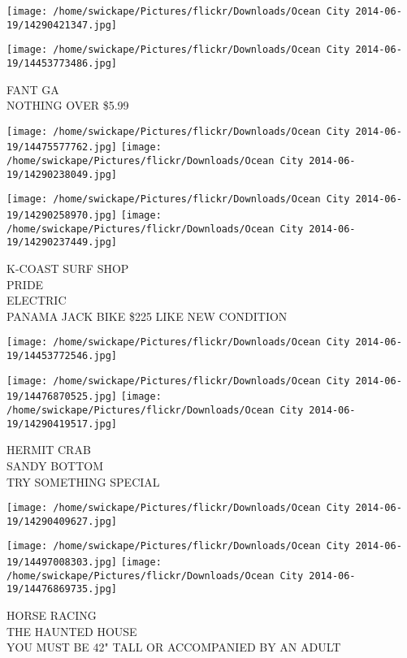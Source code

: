 \documentclass[10pt,letterpaper]{article}
\begin{document}
\texttt{[image: /home/swickape/Pictures/flickr/Downloads/Ocean City 2014-06-19/14290421347.jpg]}

\vspace{0.25in}
\texttt{[image: /home/swickape/Pictures/flickr/Downloads/Ocean City 2014-06-19/14453773486.jpg]}

FANT GA\\
NOTHING OVER \$5.99\\
\pagebreak

\texttt{[image: /home/swickape/Pictures/flickr/Downloads/Ocean City 2014-06-19/14475577762.jpg]}
\texttt{[image: /home/swickape/Pictures/flickr/Downloads/Ocean City 2014-06-19/14290238049.jpg]}

\texttt{[image: /home/swickape/Pictures/flickr/Downloads/Ocean City 2014-06-19/14290258970.jpg]}
\texttt{[image: /home/swickape/Pictures/flickr/Downloads/Ocean City 2014-06-19/14290237449.jpg]}

K{-}COAST SURF SHOP\\
PRIDE\\
ELECTRIC\\
PANAMA JACK BIKE \$225 LIKE NEW CONDITION\\
\pagebreak

\texttt{[image: /home/swickape/Pictures/flickr/Downloads/Ocean City 2014-06-19/14453772546.jpg]}

\vspace{0.25in}
\texttt{[image: /home/swickape/Pictures/flickr/Downloads/Ocean City 2014-06-19/14476870525.jpg]}
\texttt{[image: /home/swickape/Pictures/flickr/Downloads/Ocean City 2014-06-19/14290419517.jpg]}

HERMIT CRAB\\
SANDY BOTTOM\\
TRY SOMETHING SPECIAL\\
\pagebreak

\texttt{[image: /home/swickape/Pictures/flickr/Downloads/Ocean City 2014-06-19/14290409627.jpg]}

\vspace{0.25in}
\texttt{[image: /home/swickape/Pictures/flickr/Downloads/Ocean City 2014-06-19/14497008303.jpg]}
\texttt{[image: /home/swickape/Pictures/flickr/Downloads/Ocean City 2014-06-19/14476869735.jpg]}

HORSE RACING\\
THE HAUNTED HOUSE\\
YOU MUST BE 42" TALL OR ACCOMPANIED BY AN ADULT\\
\pagebreak
\end{document}
